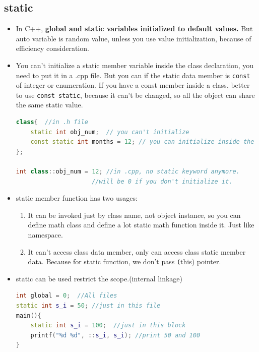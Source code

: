 \documentclass[a4paper,11pt,twoside]{book}
\begin{document}
\subsection{static}
\begin{itemize}
	\item In C++, \textbf{global and static variables initialized to default values.}  But auto variable is random value, unless you use value initialization, because of efficiency consideration. 
	
	\item You can't initialize a static member variable inside the class declaration, you need to put it in a .cpp file.   But you can if the static data member is \texttt{const} of integer or enumeration. If you have a const member inside a class, better to use \texttt{const static}, because it can't be changed, so all the object can share the same static value.
\begin{lstlisting}[frame=single, language=c++]
class{  //in .h file
	static int obj_num;  // you can't initialize
	const static int months = 12; // you can initialize inside the class
};

int class::obj_num = 12; //in .cpp, no static keyword anymore.	
                     //will be 0 if you don't initialize it.
\end{lstlisting}	
	
	\item static member function has two usages:
	\begin{enumerate}
		\item It can be invoked just by class name, not object instance, so you can define math class and define a lot static math function inside it.  Just like namespace.
		
		\item It can't access class data member, only can access class static member data. Because for static function, we don't pass \texttt(this) pointer.
	\end{enumerate}
	
	\item static can be used restrict the scope.(internal linkage)
\begin{lstlisting}[frame=single, language=c++]
int global = 0;  //All files
static int s_i = 50; //just in this file
main(){
	static int s_i = 100;  //just in this block
	printf("%d %d", ::s_i, s_i); //print 50 and 100
}
\end{lstlisting}
	\begin{description}
		

\end{description}
\end{itemize}
\end{document}
